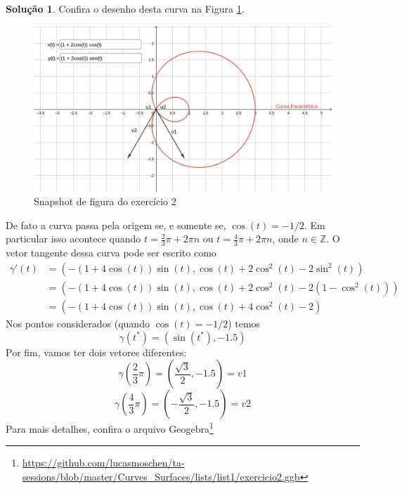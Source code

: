 \documentclass[a4paper,12pt]{article}
\theoremstyle{exer}
\theoremstyle{definition}
\newtheorem{solution}{Solução}
\theoremstyle{plain}
\begin{document}
\begin{solution}

    Confira o desenho desta curva na Figura \ref{fig-exe2}.

    \begin{figure}[ht]
        \centering
        \includegraphics[width=\textwidth]{images/exe2.png}
        \caption{Snapshot de figura do exercício 2}
        \label{fig-exe2}
    \end{figure}

    De fato a curva passa pela origem se, e somente se, $\cos(t) = -1/2$. Em particular
    isso acontece quando $t = \frac{2}{3}\pi + 2\pi n$ ou $t = \frac{4}{3}\pi
    + 2\pi n$, onde $n \in \mathbb{Z}$. O vetor tangente dessa curva pode ser
    escrito como 
    \begin{equation*}
        \begin{split}
            \gamma '(t) &= (-(1 + 4\cos(t))\sin(t), \cos(t) + 2\cos^2(t) - 2\sin^2(t))  \\
            &= (-(1 + 4\cos(t))\sin(t), \cos(t) + 2\cos^2(t) - 2(1 - \cos^2(t))) \\
            &= (-(1 + 4\cos(t))\sin(t), \cos(t) + 4\cos^2(t) - 2)
        \end{split}        
    \end{equation*}
    Nos pontos considerados (quando $\cos(t) = -1/2$) temos
    $$
    \gamma(t^*) = (\sin(t^*), -1.5)
    $$
    Por fim, vamos ter dois vetores diferentes: 
    $$
    \gamma\left(\frac{2}{3}\pi\right) = \left(\frac{\sqrt{3}}{2}, -1.5\right) = v1
    $$
    $$
    \gamma\left(\frac{4}{3}\pi\right) = \left(-\frac{\sqrt{3}}{2}, -1.5\right) = v2
    $$
    Para mais detalhes, confira o arquivo Geogebra\footnote{\url{https://github.com/lucasmoschen/ta-sessions/blob/master/Curves_Surfaces/lists/list1/exercicio2.ggb}}
\end{solution}
\end{document}
